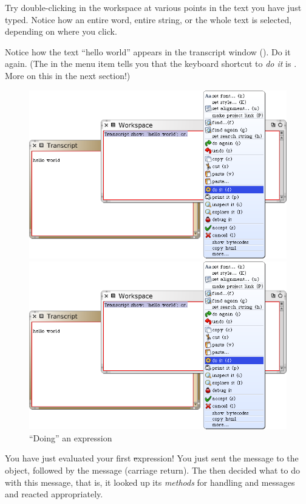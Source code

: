 \documentclass[a4paper,10pt,twoside]{book}
\begin{document}
Try double-clicking in the workspace at various points in the text you have just typed.
Notice how an entire word, entire string, or the whole text is selected, depending on where you click.

Notice how the text ``hello world'' appears in the transcript window
().
Do it again.
(The  in the menu item  tells you that the keyboard shortcut to \emph{do it} is . More on this in the next section!)

\begin{figure}[htb]
\ifluluelse
	{\centerline {\includegraphics[width=\textwidth]{Doit}}}
	{\centerline {\includegraphics[scale=0.7]{Doit}}}
\caption{``Doing'' an expression\label{fig:doit}}
\end{figure}

You have just evaluated your first \st expression!
You just sent the message  to the  object, followed by the message  (carriage return).
The  then decided what to do with this message, that is, it looked up its \emph{methods} for handling  and  messages and reacted appropriately.
\end{document}
